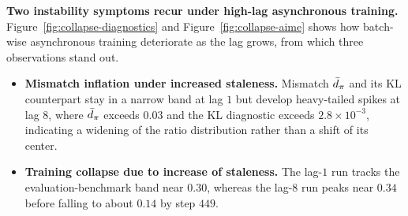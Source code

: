 
\textbf{Two instability symptoms recur under high-lag asynchronous training.} Figure~\ref{fig:collapse-diagnostics} and Figure~\ref{fig:collapse-aime} shows how batch-wise asynchronous training deteriorate as the lag grows, from which three observations stand out.
\begin{itemize}
    \item \textbf{Mismatch inflation under increased staleness.} Mismatch $\bar d_\pi$ and its KL counterpart stay in a narrow band at lag $1$ but develop heavy-tailed spikes at lag $8$, where $\bar d_\pi$ exceeds $0.03$ and the KL diagnostic exceeds $2.8\times 10^{-3}$, indicating a widening of the ratio distribution rather than a shift of its center.
    \item \textbf{Training collapse due to increase of staleness.} The lag-$1$ run tracks the evaluation-benchmark band near $0.30$, whereas the lag-$8$ run peaks near $0.34$ before falling to about $0.14$ by step $449$. 
\end{itemize}

